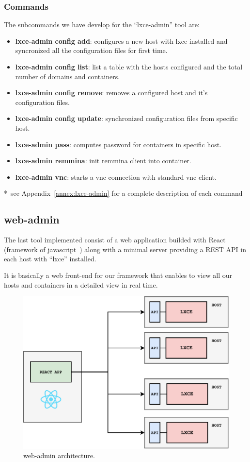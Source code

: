 \subsubsection{Commands}
The subcommands we have develop for the ``lxce-admin'' tool are:
\begin{itemize}
	\item{\textbf{lxce-admin config add}: configures a new host with lxce installed and syncronized all the configuration files for first time.}
	\item{\textbf{lxce-admin config list}: list a table with the hosts configured and the total number of domains and containers.}
	\item{\textbf{lxce-admin config remove}: removes a configured host and it's configuration files.}
	\item{\textbf{lxce-admin config update}: synchronized configuration files from specific host.}
	\item{\textbf{lxce-admin pass}: computes password for containers in specific host.}
	\item{\textbf{lxce-admin remmina}: init remmina client into container.}
	\item{\textbf{lxce-admin vnc}: starts a vnc connection with standard vnc client.}
\end{itemize}
*~see Appendix~\ref{annex:lxce-admin} for a complete description of each command

\newpage
\subsection{web-admin}
The last tool implemented consist of a web application builded with React (framework of javascript~\cite{react}) along with a minimal server providing a REST API in each host with ``lxce'' installed.

It is basically a web front-end for our framework that enables to view all our hosts and containers in a detailed view in real time.

\begin{figure}[H]
	\label{fig:Web admin architecture}
	\centering
	\includegraphics{img/03/web-admin-diagram.pdf}
	\caption[web-admin architecture]{\footnotesize{web-admin architecture.}}
\end{figure}

